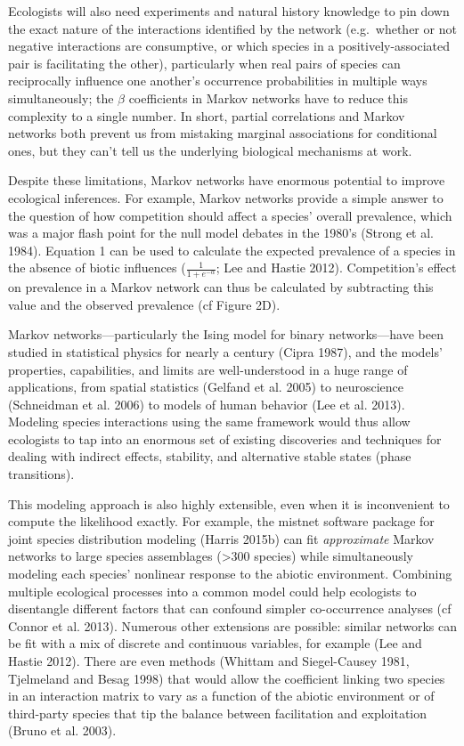 \documentclass[12pt,]{article}
\begin{document}
\begin{spacing}{1.9}
\begin{flushleft}
Ecologists will also need experiments and natural history knowledge to
pin down the exact nature of the interactions identified by the network
(e.g.~whether or not negative interactions are consumptive, or which
species in a positively-associated pair is facilitating the other),
particularly when real pairs of species can reciprocally influence one
another's occurrence probabilities in multiple ways simultaneously; the
\(\beta\) coefficients in Markov networks have to reduce this complexity
to a single number. In short, partial correlations and Markov networks
both prevent us from mistaking marginal associations for conditional
ones, but they can't tell us the underlying biological mechanisms at
work.

Despite these limitations, Markov networks have enormous potential to
improve ecological inferences. For example, Markov networks provide a
simple answer to the question of how competition should affect a
species' overall prevalence, which was a major flash point for the null
model debates in the 1980's (Strong et al. 1984). Equation 1 can be used
to calculate the expected prevalence of a species in the absence of
biotic influences (\(\frac{1}{1 + e^{-\alpha}}\); Lee and Hastie 2012).
Competition's effect on prevalence in a Markov network can thus be
calculated by subtracting this value and the observed prevalence (cf
Figure 2D).

Markov networks---particularly the Ising model for binary
networks---have been studied in statistical physics for nearly a century
(Cipra 1987), and the models' properties, capabilities, and limits are
well-understood in a huge range of applications, from spatial statistics
(Gelfand et al. 2005) to neuroscience (Schneidman et al. 2006) to models
of human behavior (Lee et al. 2013). Modeling species interactions using
the same framework would thus allow ecologists to tap into an enormous
set of existing discoveries and techniques for dealing with indirect
effects, stability, and alternative stable states (phase transitions).

This modeling approach is also highly extensible, even when it is
inconvenient to compute the likelihood exactly. For example, the mistnet
software package for joint species distribution modeling (Harris 2015b)
can fit \emph{approximate} Markov networks to large species assemblages
(\textgreater{}300 species) while simultaneously modeling each species'
nonlinear response to the abiotic environment. Combining multiple
ecological processes into a common model could help ecologists to
disentangle different factors that can confound simpler co-occurrence
analyses (cf Connor et al. 2013). Numerous other extensions are
possible: similar networks can be fit with a mix of discrete and
continuous variables, for example (Lee and Hastie 2012). There are even
methods (Whittam and Siegel-Causey 1981, Tjelmeland and Besag 1998) that
would allow the coefficient linking two species in an interaction matrix
to vary as a function of the abiotic environment or of third-party
species that tip the balance between facilitation and exploitation
(Bruno et al. 2003).


\end{flushleft}
\end{spacing}
\end{document}
